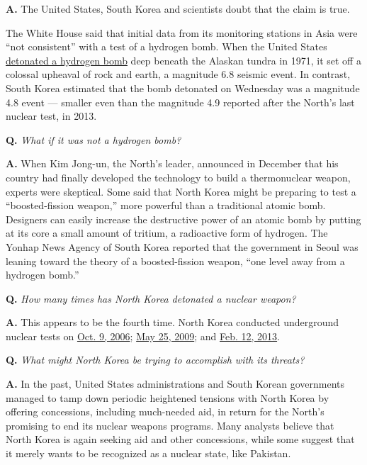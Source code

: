 \textbf{A.} The United States, South Korea and scientists doubt that the
claim is true.

The White House said that initial data from its monitoring stations in
Asia were ``not consistent'' with a test of a hydrogen bomb. When the
United States
\href{http://www.nytimes3xbfgragh.onion/2016/01/07/science/comparisons-dont-support-north-koreas-claims-of-a-hydrogen-bomb-experts-say.html}{detonated
a hydrogen bomb} deep beneath the Alaskan tundra in 1971, it set off a
colossal upheaval of rock and earth, a magnitude 6.8 seismic event. In
contrast, South Korea estimated that the bomb detonated on Wednesday was
a magnitude 4.8 event --- smaller even than the magnitude 4.9 reported
after the North's last nuclear test, in 2013.

\textbf{Q.} \emph{What if it was not a hydrogen bomb?}

\textbf{A.} When Kim Jong-un, the North's leader, announced in December
that his country had finally developed the technology to build a
thermonuclear weapon, experts were skeptical. Some said that North Korea
might be preparing to test a ``boosted-fission weapon,'' more powerful
than a traditional atomic bomb. Designers can easily increase the
destructive power of an atomic bomb by putting at its core a small
amount of tritium, a radioactive form of hydrogen. The Yonhap News
Agency of South Korea reported that the government in Seoul was leaning
toward the theory of a boosted-fission weapon, ``one level away from a
hydrogen bomb.''

\textbf{Q.} \emph{How many times has North Korea detonated a nuclear
weapon?}

\textbf{A.} This appears to be the fourth time. North Korea conducted
underground nuclear tests on
\href{http://www.nytimes3xbfgragh.onion/2006/10/09/world/asia/09korea.html}{Oct.
9, 2006};
\href{http://www.nytimes3xbfgragh.onion/2009/05/25/world/asia/25nuke.html}{May
25, 2009}; and
\href{http://www.nytimes3xbfgragh.onion/2013/02/12/world/asia/north-korea-nuclear-test.html}{Feb.
12, 2013}.

\textbf{Q.} \emph{What might North Korea be trying to accomplish with
its threats?}

\textbf{A.} In the past, United States administrations and South Korean
governments managed to tamp down periodic heightened tensions with North
Korea by offering concessions, including much-needed aid, in return for
the North's promising to end its nuclear weapons programs. Many analysts
believe that North Korea is again seeking aid and other concessions,
while some suggest that it merely wants to be recognized as a nuclear
state, like Pakistan.

